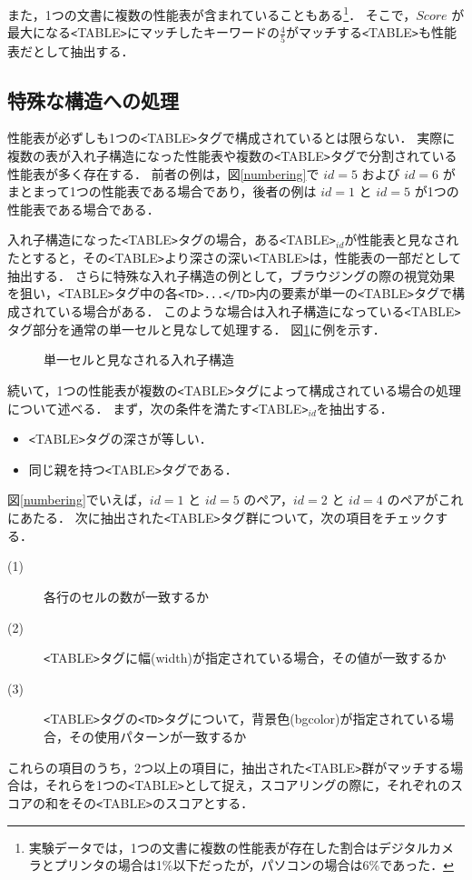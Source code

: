 また，1つの文書に複数の性能表が含まれていることもある\footnote{実験データでは，1つの文書に複数の性能表が存在した割合はデジタルカメラとプリンタの場合は1\%以下だったが，パソコンの場合は6\%であった．}．
そこで，$Score$ が最大になる\verb+<+TABLE\verb+>+にマッチしたキーワードの$\frac{4}{5}$がマッチする\verb+<+TABLE\verb+>+も性能表だとして抽出する．

\subsection{特殊な構造への処理}

性能表が必ずしも1つの\verb+<+TABLE\verb+>+タグで構成されているとは限らない．
実際に複数の表が入れ子構造になった性能表や複数の\verb+<+TABLE\verb+>+タグで分割されている性能表が多く存在する．
前者の例は，図\ref{numbering}で $id=5$ および $id=6$ がまとまって1つの性能表である場合であり，後者の例は $id=1$ と $id=5$ が1つの性能表である場合である．

入れ子構造になった\verb+<+TABLE\verb+>+タグの場合，ある\verb+<+TABLE\verb+>+$_{id}$が性能表と見なされたとすると，その\verb+<+TABLE\verb+>+より深さの深い\verb+<+TABLE\verb+>+は，性能表の一部だとして抽出する．
さらに特殊な入れ子構造の例として，ブラウジングの際の視覚効果を狙い，\verb+<+TABLE\verb+>+タグ中の各\verb+<TD>...</TD>+内の要素が単一の\verb+<+TABLE\verb+>+タグで構成されている場合がある．
このような場合は入れ子構造になっている\verb+<+TABLE\verb+>+タグ部分を通常の単一セルと見なして処理する．
図\ref{nest}に例を示す．

\begin{figure}
\begin{center}
\end{center}
\vspace{-3mm}
\caption{単一セルと見なされる入れ子構造}
\label{nest}
\end{figure}

続いて，1つの性能表が複数の\verb+<+TABLE\verb+>+タグによって構成されている場合の処理について述べる．
まず，次の条件を満たす\verb+<+TABLE\verb+>+$_{id}$を抽出する．
\begin{itemize}
\item \verb+<+TABLE\verb+>+タグの深さが等しい．
\item 同じ親を持つ\verb+<+TABLE\verb+>+タグである．
\end{itemize}
図\ref{numbering}でいえば，$id=1$ と $id=5$ のペア，$id=2$ と $id=4$ のペアがこれにあたる．
次に抽出された\verb+<+TABLE\verb+>+タグ群について，次の項目をチェックする．
\begin{description}
\item[(1)] 各行のセルの数が一致するか
\item[(2)] \verb+<+TABLE\verb+>+タグに幅(width)が指定されている場合，その値が一致するか
\item[(3)] \verb+<+TABLE\verb+>+タグの\verb+<TD>+タグについて，背景色(bgcolor)が指定されている場合，その使用パターンが一致するか
\end{description}
これらの項目のうち，2つ以上の項目に，抽出された\verb+<+TABLE\verb+>+群がマッチする場合は，それらを1つの\verb+<+TABLE\verb+>+として捉え，スコアリングの際に，それぞれのスコアの和をその\verb+<+TABLE\verb+>+のスコアとする．

